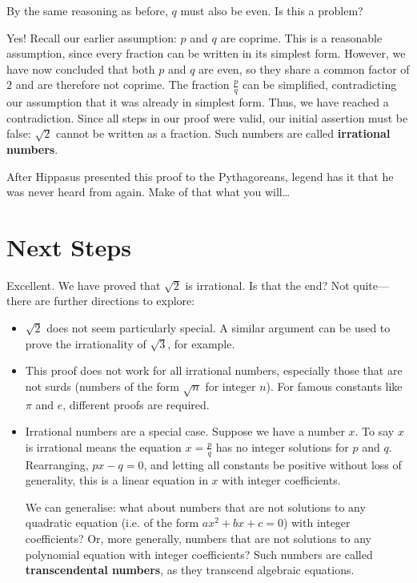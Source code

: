 \documentclass{article}
\begin{document}
By the same reasoning as before, $q$ must also be even. Is this a problem?

Yes! Recall our earlier assumption: $p$ and $q$ are coprime. This is a reasonable assumption, since every fraction can be written in its simplest form. However, we have now concluded that both $p$ and $q$ are even, so they share a common factor of $2$ and are therefore not coprime. The fraction $\frac{p}{q}$ can be simplified, contradicting our assumption that it was already in simplest form. Thus, we have reached a contradiction. Since all steps in our proof were valid, our initial assertion must be false: $\sqrt{2}$ cannot be written as a fraction. Such numbers are called \textbf{irrational numbers}.

After Hippasus presented this proof to the Pythagoreans, legend has it that he was never heard from again. Make of that what you will\ldots

\section*{Next Steps}

Excellent. We have proved that $\sqrt{2}$ is irrational. Is that the end? Not quite---there are further directions to explore:

\begin{itemize}
    \item $\sqrt{2}$ does not seem particularly special. A similar argument can be used to prove the irrationality of $\sqrt{3}$, for example.
    \item This proof does not work for all irrational numbers, especially those that are not surds (numbers of the form $\sqrt{n}$ for integer $n$). For famous constants like $\pi$ and $e$, different proofs are required.
    \item Irrational numbers are a special case. Suppose we have a number $x$. To say $x$ is irrational means the equation $x = \frac{p}{q}$ has no integer solutions for $p$ and $q$. Rearranging, $px - q = 0$, and letting all constants be positive without loss of generality, this is a linear equation in $x$ with integer coefficients.

    We can generalise: what about numbers that are not solutions to any quadratic equation (i.e. of the form $ax^2 + bx + c = 0$) with integer coefficients? Or, more generally, numbers that are not solutions to any polynomial equation with integer coefficients? Such numbers are called \textbf{transcendental numbers}, as they transcend algebraic equations.
\end{itemize}
\end{document}

